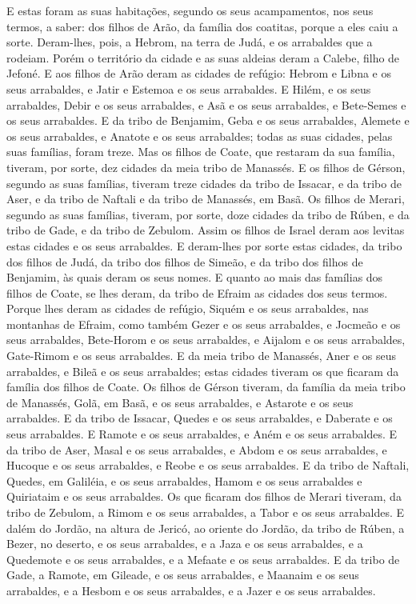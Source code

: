 E estas foram as suas habitações, segundo os seus acampamentos,
nos seus termos, a saber: dos filhos de Arão, da família dos
coatitas, porque a eles caiu a sorte. Deram-lhes, pois, a
Hebrom, na terra de Judá, e os arrabaldes que a rodeiam.
Porém o território da cidade e as suas aldeias deram a
Calebe, filho de Jefoné. E aos filhos de Arão deram as
cidades de refúgio: Hebrom e Libna e os seus arrabaldes, e Jatir e
Estemoa e os seus arrabaldes. E Hilém, e os seus arrabaldes,
Debir e os seus arrabaldes, e Asã e os seus arrabaldes, e
Bete-Semes e os seus arrabaldes. E da tribo de Benjamim, Geba
e os seus arrabaldes, Alemete e os seus arrabaldes, e Anatote e os
seus arrabaldes; todas as suas cidades, pelas suas famílias, foram
treze. Mas os filhos de Coate, que restaram da sua família,
tiveram, por sorte, dez cidades da meia tribo de Manassés. E
os filhos de Gérson, segundo as suas famílias, tiveram treze cidades
da tribo de Issacar, e da tribo de Aser, e da tribo de Naftali e da
tribo de Manassés, em Basã. Os filhos de Merari, segundo as
suas famílias, tiveram, por sorte, doze cidades da tribo de Rúben, e
da tribo de Gade, e da tribo de Zebulom. Assim os filhos de
Israel deram aos levitas estas cidades e os seus arrabaldes.
E deram-lhes por sorte estas cidades, da tribo dos filhos de
Judá, da tribo dos filhos de Simeão, e da tribo dos filhos de
Benjamim, às quais deram os seus nomes. E quanto ao mais das
famílias dos filhos de Coate, se lhes deram, da tribo de Efraim as
cidades dos seus termos. Porque lhes deram as cidades de
refúgio, Siquém e os seus arrabaldes, nas montanhas de Efraim, como
também Gezer e os seus arrabaldes, e Jocmeão e os seus
arrabaldes, Bete-Horom e os seus arrabaldes, e Aijalom e os
seus arrabaldes, Gate-Rimom e os seus arrabaldes. E da meia
tribo de Manassés, Aner e os seus arrabaldes, e Bileã e os seus
arrabaldes; estas cidades tiveram os que ficaram da família dos
filhos de Coate. Os filhos de Gérson tiveram, da família da
meia tribo de Manassés, Golã, em Basã, e os seus arrabaldes, e
Astarote e os seus arrabaldes. E da tribo de Issacar, Quedes
e os seus arrabaldes, e Daberate e os seus arrabaldes. E
Ramote e os seus arrabaldes, e Aném e os seus arrabaldes. E
da tribo de Aser, Masal e os seus arrabaldes, e Abdom e os seus
arrabaldes, e Hucoque e os seus arrabaldes, e Reobe e os seus
arrabaldes. E da tribo de Naftali, Quedes, em Galiléia, e os
seus arrabaldes, Hamom e os seus arrabaldes e Quiriataim e os seus
arrabaldes. Os que ficaram dos filhos de Merari tiveram, da
tribo de Zebulom, a Rimom e os seus arrabaldes, a Tabor e os seus
arrabaldes. E dalém do Jordão, na altura de Jericó, ao
oriente do Jordão, da tribo de Rúben, a Bezer, no deserto, e os seus
arrabaldes, e a Jaza e os seus arrabaldes, e a Quedemote e os
seus arrabaldes, e a Mefaate e os seus arrabaldes. E da tribo
de Gade, a Ramote, em Gileade, e os seus arrabaldes, e Maanaim e os
seus arrabaldes, e a Hesbom e os seus arrabaldes, e a Jazer e
os seus arrabaldes.

